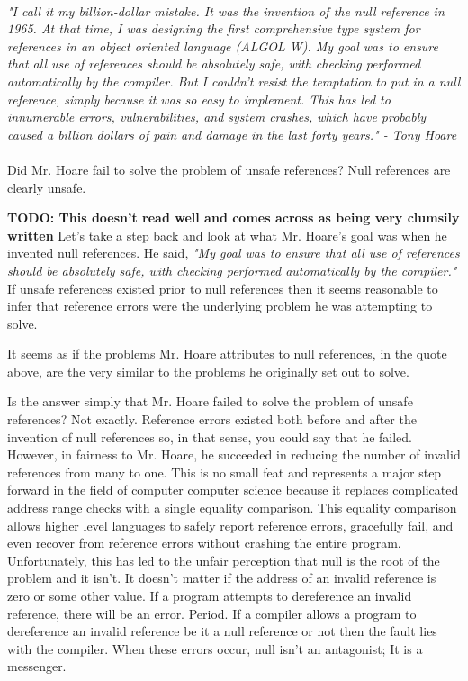 \documentclass[hidelinks]{article}
\begin{document}
\paragraph{}\textit{"I call it my billion-dollar mistake. It was the invention of the null reference in 1965. At that time, I was designing the first comprehensive type system for references in an object oriented language (ALGOL W). My goal was to ensure that all use of references should be absolutely safe, with checking performed automatically by the compiler. But I couldn't resist the temptation to put in a null reference, simply because it was so easy to implement. This has led to innumerable errors, vulnerabilities, and system crashes, which have probably caused a billion dollars of pain and damage in the last forty years." - Tony Hoare}

\paragraph{}Did Mr. Hoare fail to solve the problem of unsafe references? Null references are clearly unsafe.

\textbf{TODO: This doesn't read well and comes across as being very clumsily written}
Let's take a step back and look at what Mr. Hoare's goal was when he invented null references. He said, \textit{"My goal was to ensure that all use of references should be absolutely safe, with checking performed automatically by the compiler."} If unsafe references existed prior to null references then it seems reasonable to infer that reference errors were the underlying problem he was attempting to solve. 

It seems as if the problems Mr. Hoare attributes to null references, in the quote above, are the very similar to the problems he originally set out to solve. 

Is the answer simply that Mr. Hoare failed to solve the problem of unsafe references? Not exactly. Reference errors existed both before and after the invention of null references so, in that sense, you could say that he failed. However, in fairness to Mr. Hoare, he succeeded in reducing the number of invalid references from many to one. This is no small feat and represents a major step forward in the field of computer computer science because it replaces complicated address range checks with a single equality comparison. This equality comparison allows higher level languages to safely report reference errors, gracefully fail, and even recover from reference errors without crashing the entire program. Unfortunately, this has led to the unfair perception that null is the root of the problem and it isn't. It doesn't matter if the address of an invalid reference is zero or some other value. If a program attempts to dereference an invalid reference, there will be an error. Period. If a compiler allows a program to dereference an invalid reference be it a null reference or not then the fault lies with the compiler. When these errors occur, null isn't an antagonist; It is a messenger.
\end{document}
